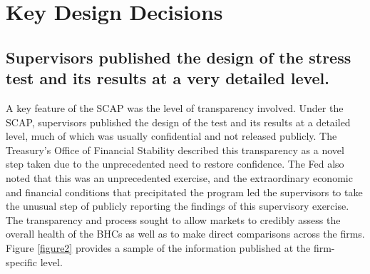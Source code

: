 \documentclass[12pt]{article}
\begin{document}
\section{Key Design Decisions}

\subsection{Supervisors published the design of the stress test and
its results at a very detailed
level.}

A key feature of the SCAP was the level of transparency involved. Under
the SCAP, supervisors published the design of the test and its
results at a detailed level, much of which was usually confidential and
not released publicly. The Treasury's Office of Financial Stability
described this transparency as a novel step taken due to the
unprecedented need to restore confidence. The Fed also noted that this
was an unprecedented exercise, and the extraordinary economic and
financial conditions that precipitated the program led the supervisors
to take the unusual step of publicly reporting the findings of this
supervisory exercise. The transparency and process sought to allow
markets to credibly assess the overall health of the BHCs as well
as to make direct comparisons across the firms. Figure \ref{figure2} provides a sample
of the information published at the firm-specific level.
\end{document}
